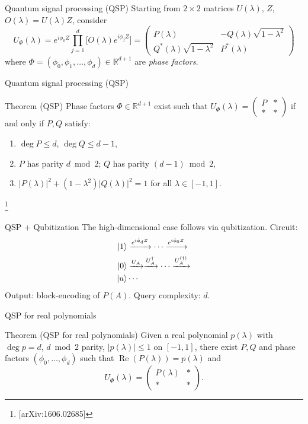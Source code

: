 \documentclass[aspectratio=169]{beamer}
\begin{document}
\begin{frame}{Quantum signal processing (QSP)}
Starting from $2\times 2$ matrices $U(\lambda)$, $Z$, $O(\lambda)=U(\lambda)Z$, consider
$$U_\Phi(\lambda)=e^{i\phi_0 Z}\prod_{j=1}^{d}\bigl[O(\lambda)e^{i\phi_j Z}\bigr]
=\begin{pmatrix}P(\lambda)&-Q(\lambda)\sqrt{1-\lambda^2}\\Q^*(\lambda)\sqrt{1-\lambda^2}&P^*(\lambda)\end{pmatrix}$$
where $\Phi=(\phi_0,\phi_1,\ldots,\phi_d)\in\mathbb{R}^{d+1}$ are \emph{phase factors}.
\end{frame}

\begin{frame}{Quantum signal processing (QSP)}
\begin{block}{Theorem (QSP)}
Phase factors $\Phi\in\mathbb{R}^{d+1}$ exist such that $U_\Phi(\lambda)=\begin{pmatrix}P&*\\*&*\end{pmatrix}$
if and only if $P,Q$ satisfy:
\begin{enumerate}
\item $\deg P\le d$, $\deg Q\le d-1$,
\item $P$ has parity $d\bmod 2$; $Q$ has parity $(d-1)\bmod 2$,
\item $|P(\lambda)|^2+(1-\lambda^2)|Q(\lambda)|^2=1$ for all $\lambda\in[-1,1]$.
\end{enumerate}
\end{block}\footnote{[arXiv:1606.02685]}
\end{frame}

\begin{frame}{QSP + Qubitization}
The high-dimensional case follows via qubitization. Circuit:
\begin{align*}
\ket{1}&\xrightarrow{e^{i\tilde\phi_d Z}}\cdots\xrightarrow{e^{i\tilde\phi_0 Z}}\\
\ket{0}&\xrightarrow{U_A}\xrightarrow{U_A^\dagger}\cdots\xrightarrow{U_A^{(\dagger)}}\\
\ket{u}&\cdots
\end{align*}
Output: block-encoding of $P(A)$. \quad Query complexity: $d$.
\end{frame}

\begin{frame}{QSP for real polynomials}
\begin{block}{Theorem (QSP for real polynomials)}
Given a real polynomial $p(\lambda)$ with $\deg p=d$, $d\bmod 2$ parity, $|p(\lambda)|\le 1$ on $[-1,1]$, there exist $P,Q$ and phase factors $(\phi_0,\ldots,\phi_d)$ such that $\operatorname{Re}(P(\lambda))=p(\lambda)$ and
$$U_\Phi(\lambda)=\begin{pmatrix}P(\lambda)&*\\*&*\end{pmatrix}.$$
\end{block}
\end{frame}
\end{document}
